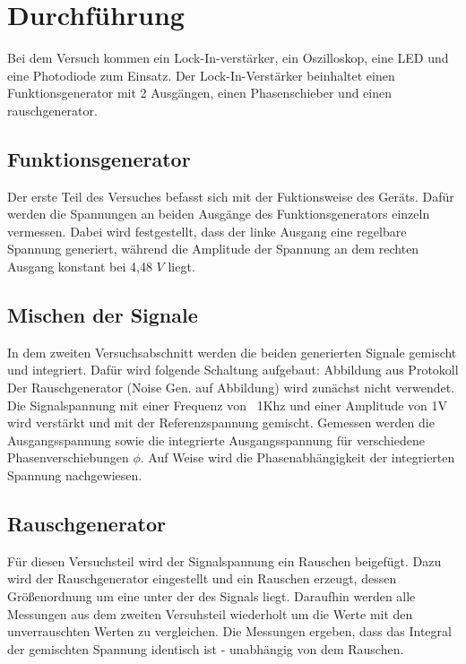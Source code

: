 \section{Durchführung}
\label{sec:Durchführung}

Bei dem Versuch kommen ein Lock-In-verstärker, ein Oszilloskop, eine
LED und eine Photodiode zum Einsatz. Der Lock-In-Verstärker beinhaltet
einen Funktionsgenerator  mit 2 Ausgängen, einen Phasenschieber und einen
rauschgenerator.

\subsection{Funktionsgenerator}
Der erste Teil des Versuches befasst sich mit der Fuktionsweise des Geräts.
Dafür werden die Spannungen an beiden Ausgänge des Funktionsgenerators einzeln
vermessen. Dabei wird festgestellt, dass der linke Ausgang eine regelbare
Spannung generiert, während die Amplitude der Spannung an dem rechten
Ausgang konstant bei 4,48 $V$ liegt.

\subsection{Mischen der Signale}
In dem zweiten Versuchsabschnitt werden die beiden generierten Signale gemischt
und integriert. Dafür wird folgende Schaltung aufgebaut:
Abbildung aus Protokoll
Der Rauschgenerator (Noise Gen. auf Abbildung) wird zunächst nicht verwendet.
Die Signalspannung mit einer Frequenz von ~1Khz und einer Amplitude von 1V
wird verstärkt und mit der
Referenzspannung gemischt. Gemessen werden die Ausgangsspannung sowie die
integrierte Ausgangsspannung für verschiedene Phasenverschiebungen $\phi$. Auf
Weise wird die Phasenabhängigkeit der integrierten Spannung nachgewiesen.

\subsection{Rauschgenerator}
Für diesen Versuchsteil wird der Signalspannung ein Rauschen beigefügt. Dazu
wird der Rauschgenerator eingestellt und ein Rauschen erzeugt, dessen
Größenordnung um eine unter der des Signals liegt. Daraufhin werden alle
Messungen aus dem zweiten Versuhsteil wiederholt um die Werte mit den
unverrauschten Werten zu vergleichen. Die Messungen ergeben, dass das Integral
der gemischten Spannung identisch ist - unabhängig von dem Rauschen.

